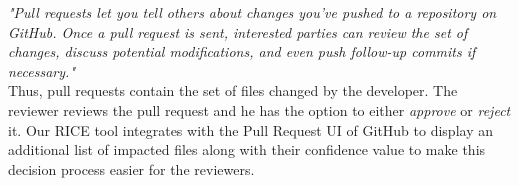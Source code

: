 \textit{"Pull requests let you tell others about changes you've pushed to a repository on GitHub. Once a pull request is sent, interested parties can review the set of changes, discuss potential modifications, and even push follow-up commits if necessary."}~\cite{GitHub} \\

Thus, pull requests contain the set of files changed by the developer. The reviewer reviews the pull request and he has the option to either \textit{approve} or \textit{reject} it. Our RICE tool integrates with the Pull Request UI of GitHub to display an additional list of impacted files along with their confidence value to make this decision process easier for the reviewers.   


